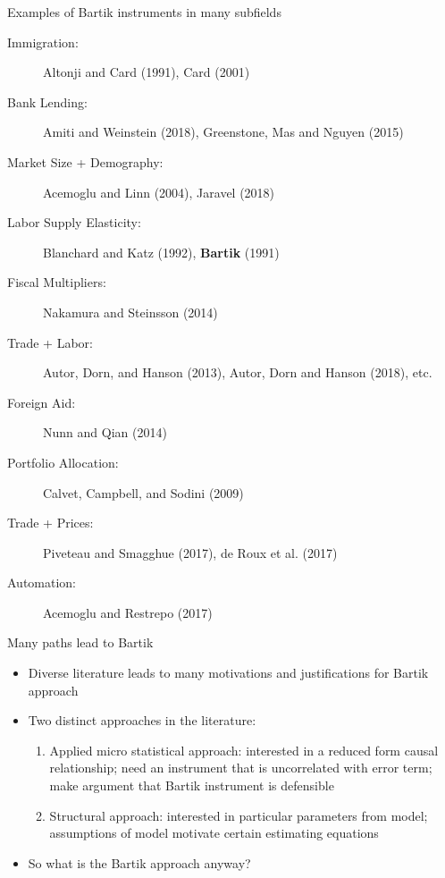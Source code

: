 \documentclass[notes,11pt, aspectratio=169]{beamer}
\begin{document}
\begin{frame}{Examples of Bartik instruments in many subfields}
  \begin{description}
  \item[Immigration:] Altonji and Card (1991), Card (2001)
    \smallskip
  \item[Bank Lending:] Amiti and Weinstein (2018), Greenstone, Mas and Nguyen (2015)
    \smallskip    
  \item[Market Size + Demography:] Acemoglu and Linn (2004), Jaravel (2018)
    \smallskip    
  \item[Labor Supply Elasticity:] Blanchard and Katz (1992), \textbf{Bartik} (1991)
    \smallskip
  \item[Fiscal Multipliers:] Nakamura and Steinsson (2014)
    \smallskip    
  \item[Trade + Labor:] Autor, Dorn, and Hanson (2013), Autor, Dorn and Hanson (2018), etc. 
    \smallskip    
  \item[Foreign Aid:] Nunn and Qian (2014)
    \smallskip
  \item[Portfolio Allocation:] Calvet, Campbell, and Sodini (2009)
    \smallskip
  \item[Trade + Prices:] Piveteau and Smagghue (2017), de Roux et al. (2017)
    \smallskip    
  \item[Automation:] Acemoglu and Restrepo (2017)
  \end{description}
\end{frame}

\begin{frame}{Many paths lead to Bartik}
  \begin{itemize}
  \item Diverse literature leads to many motivations and justifications for Bartik approach
    \medskip
  \item Two distinct approaches in the literature:
    \begin{enumerate}
    \item Applied micro statistical approach: interested in a reduced
      form causal relationship; need an instrument that is
      uncorrelated with error term; make argument that Bartik
      instrument is defensible \smallskip
    \item Structural approach: interested in particular parameters
      from model; assumptions of model motivate certain estimating
      equations
    \end{enumerate}
    \medskip
  \item So what is the Bartik approach anyway?
  \end{itemize}
\end{frame}
\end{document}
